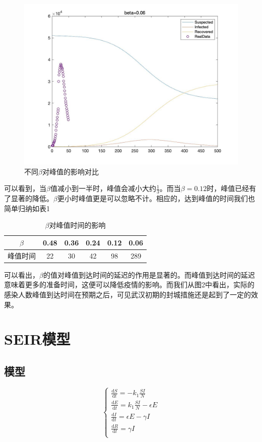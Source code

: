 \documentclass[UTF8]{ctexart}
\begin{document}
\begin{figure}[H]
				\qquad
				\includegraphics[scale=0.15]{beta1}
				\caption{不同$\beta$对峰值的影响对比}
			\end{figure}
			
			可以看到，当$\beta$值减小到一半时，峰值会减小大约$\frac13$。而当$\beta=0.12$时，峰值已经有了显著的降低。$\beta$更小时峰值更是可以忽略不计。相应的，达到峰值的时间我们也简单归纳如表1
			\begin{table}[H]
				\begin{center}
					\begin{tabular}{*{5}{c|}c}
						$\beta$&0.48&0.36&0.24&0.12&0.06 \\ \hline
						峰值时间&22&30&42&98&289
					\end{tabular}
				\end{center}
				\caption{$\beta$对峰值时间的影响}
			\end{table}
		
			可以看出，$\beta$的值对峰值到达时间的延迟的作用是显著的。而峰值到达时间的延迟意味着更多的准备时间，这便可以降低疫情的影响。而我们从图2中看出，实际的感染人数峰值到达时间在预期之后，可见武汉初期的封城措施还是起到了一定的效果。
		
		
	\section{SEIR模型}
		\subsection{模型}
			\[
			\begin{cases}
			{\frac{\mathrm{d}S}{\mathrm{d}t} = -k_1\frac{SI}{N}}\\
			{\frac{\mathrm{d}E}{\mathrm{d}t} = k_1\frac{SI}{N} - \epsilon E}\\
			{\frac{\mathrm{d}I}{\mathrm{d}t} = \epsilon E - \gamma I}\\
			{\frac{\mathrm{d}R}{\mathrm{d}t} = \gamma I}\\
			\end{cases}
			\]
		
\end{document}
